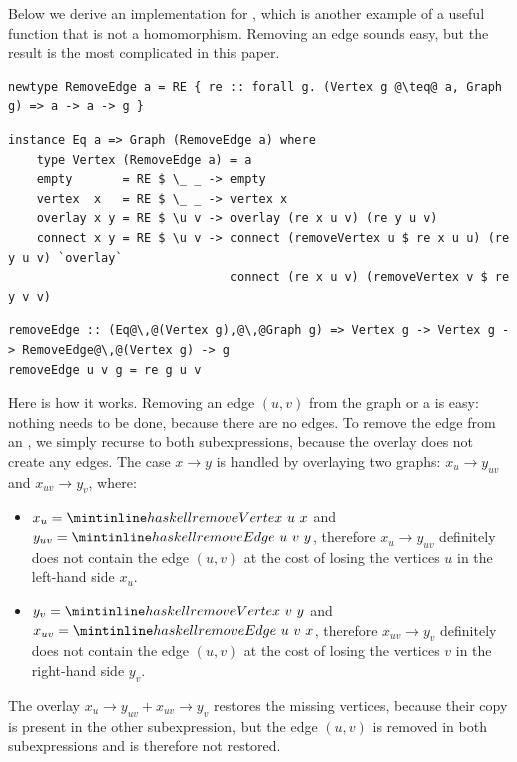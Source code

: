 Below we derive an implementation for , which is another
example of a useful function that is not a homomorphism. Removing an edge sounds
easy, but the result is the most complicated  in this paper.

\begin{verbatim}
newtype RemoveEdge a = RE { re :: forall g. (Vertex g @\teq@ a, Graph g) => a -> a -> g }
\end{verbatim}
\vspace{1mm}
\begin{verbatim}
instance Eq a => Graph (RemoveEdge a) where
    type Vertex (RemoveEdge a) = a
    empty       = RE $ \_ _ -> empty
    vertex  x   = RE $ \_ _ -> vertex x
    overlay x y = RE $ \u v -> overlay (re x u v) (re y u v)
    connect x y = RE $ \u v -> connect (removeVertex u $ re x u u) (re y u v) `overlay`
                               connect (re x u v) (removeVertex v $ re y v v)
\end{verbatim}
\vspace{0mm}
\begin{verbatim}
removeEdge :: (Eq@\,@(Vertex g),@\,@Graph g) => Vertex g -> Vertex g -> RemoveEdge@\,@(Vertex g) -> g
removeEdge u v g = re g u v
\end{verbatim}

\noindent
Here is how it works. Removing an edge $(u,v)$ from the  graph
or a  is easy:
nothing needs to be done, because there are no edges. To remove the edge from an
, we simply recurse to both subexpressions, because the overlay does not create
any edges. The  case $x \rightarrow y$ is handled by overlaying two graphs:
$x_u \rightarrow y_{uv}$ and $x_{uv} \rightarrow y_v$, where:

\begin{itemize}
    \item $x_u = \hs{removeVertex}~u~x$ and $y_{uv} = \hs{removeEdge}~u~v~y$,
    therefore $x_u \rightarrow y_{uv}$ definitely does not contain the edge $(u,v)$
    at the cost of losing the vertices $u$ in the left-hand side $x_u$.
    \item $y_v = \hs{removeVertex}~v~y$ and $x_{uv} = \hs{removeEdge}~u~v~x$,
    therefore $x_{uv} \rightarrow y_v$ definitely does not contain the edge $(u,v)$
    at the cost of losing the vertices $v$ in the right-hand side $y_v$.
\end{itemize}
\noindent
The overlay $x_u \rightarrow y_{uv} + x_{uv} \rightarrow y_v$ restores the missing
vertices, because their copy is present in the other subexpression, but the
edge $(u,v)$ is removed in both subexpressions and is therefore not restored.

